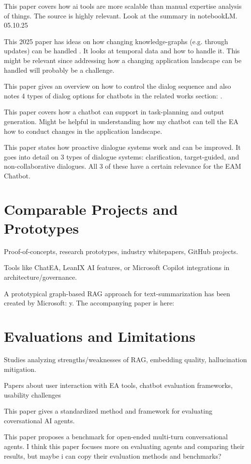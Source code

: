 This paper covers how ai tools are more scalable than manual expertise analysis of things. The source is highly relevant. Look at the summary in notebookLM. 05.10.25 \cite{gu2024survey}

This 2025 paper has ideas on how changing knowledge-graphs (e.g. through updates) can be handled \cite{temporalGraphRag}. It looks at temporal data and how to handle it. This might be relevant since addressing how a changing application landscape can be handled will probably be a challenge.

This paper gives an overview on how to control the dialog sequence and also notes 4 types of dialog options for chatbots in the related works section: \cite{li2025chatsopsopguidedmctsplanning}.

This paper \cite{Zhai_2025} covers how a chatbot can support in task-planning and output generation. Might be helpful in understanding how my chatbot can tell the EA how to conduct changes in the application landscape.

This paper \cite{deng2023promptingevaluatinglargelanguage} states how proactive dialogue systems work and can be improved. It goes into detail on 3 types of dialogue systems: clarification, target-guided, and non-collaborative dialogues. All 3 of these have a certain relevance for the EAM Chatbot.

%
%
\section{Comparable Projects and Prototypes}
\label{sec:intro:prototypes}
Proof-of-concepts, research prototypes, industry whitepapers, GitHub projects.

Tools like ChatEA, LeanIX AI features, or Microsoft Copilot integrations in architecture/governance.

A prototypical graph-based RAG approach for text-summarization has been created by Microsoft: y\cite{MsGraphRAGPrototype}. The accompanying paper is here: \cite{MsGraphRAGPaper}

%
%
\section{Evaluations and Limitations}
\label{sec:intro:limitations}
Studies analyzing strengths/weaknesses of RAG, embedding quality, hallucination mitigation.

Papers about user interaction with EA tools, chatbot evaluation frameworks, usability challenges

This paper \cite{evaluationFrameworkLLMs} gives a standardized method and framework for evaluating coversational AI agents.

This paper \cite{liu2023agentbench} proposes a benchmark for open-ended multi-turn conversational agents. I think this paper focuses more on evaluating agents and comparing their results, but maybe i can copy their evaluation methods and benchmarks?








